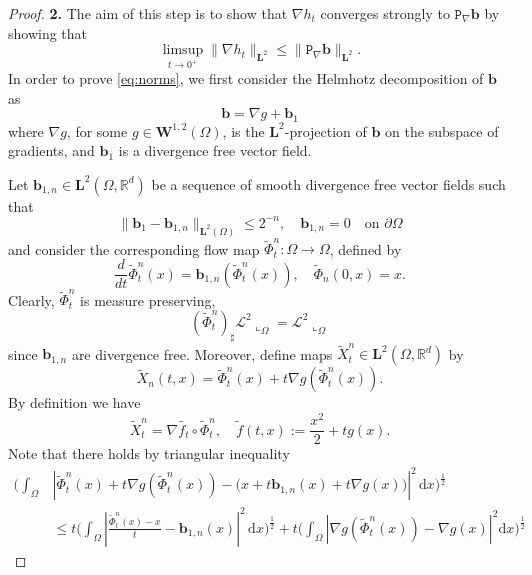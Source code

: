 \documentclass[11pt, twoside, reqno]{amsart}
\theoremstyle{definition} \newtheorem{definition}{Definition}[section]
\theoremstyle{definition} \newtheorem{remark}[definition]{Remark}
\theoremstyle{plain} \newtheorem{lemma}[definition]{Lemma}
\theoremstyle{plain} \newtheorem{proposition}[definition]{Proposition}
\theoremstyle{plain} \newtheorem{theorem}[definition]{Theorem}
\theoremstyle{plain} \newtheorem{corollary}[definition]{Corollary}
\theoremstyle{definition} \newtheorem{example}[definition]{Example}
\theoremstyle{plain} \newtheorem{claim}[clai]{Claim}
\theoremstyle{definition} \newtheorem{assumption}[definition]{Assumption}
\newcommand{\1}{\mathbbm 1}
\renewcommand{\b}{\mathbf b}
\numberwithin{equation}{section} %
\theoremstyle{plain} \newtheorem*{theorem*}{Theorem}
\theoremstyle{plain} \newtheorem{mthm}[maintheorem]{Main Theorem}
\theoremstyle{plain} \newtheorem*{mthm*}{Main Theorem}
\theoremstyle{plain} \newtheorem*{conjecture*}{Conjecture}
\theoremstyle{plain} \newtheorem{conjecture}[definition]{Conjecture}
\theoremstyle{plain} \newtheorem*{problem*}{Problem}
\begin{document}
\begin{proof}
\vspace{0.5cm}
\textbf{2.}
The aim of this step is to show that $\nabla h_t$ converges strongly to $\mathtt P_\nabla \b$ by showing that 
\begin{equation}\label{eq:norms}
    \limsup_{t \to 0^+} \|\nabla h_t\|_{\mathbf L^2} \leq \|\mathtt P_\nabla \b\|_{\mathbf L^2}.
\end{equation}
In order to prove \eqref{eq:norms}, we first consider the Helmhotz decomposition of $\b$ as
\begin{equation*}
\b = \nabla g + \b_1
\end{equation*}
where $\nabla g$, for some $g \in \mathbf W^{1,2}(\Omega)$, is the $\mathbf L^2$-projection of $\b$ on the subspace of gradients, and $\b_1$ is a divergence free vector field. 

Let $\b_{1,n} \in \mathbf L^2(\Omega, \mathbb R^d)$ be a sequence of smooth divergence free vector fields such that
\begin{equation}\label{eq:bnest}
\|\b_1 - \b_{1,n}\|_{\mathbf L^2(\Omega)} \leq 2^{-n}, \quad \b_{1,n} = 0 \quad \text{on $\partial \Omega$}
\end{equation}
and consider the corresponding flow map $\tilde \Phi^n_t: \Omega \to \Omega$, defined by
\begin{equation*}
\frac{d}{dt} \tilde \Phi^n_t(x) = \b_{1,n}(\tilde \Phi^n_t(x)), \quad \tilde \Phi_n(0,x) = x.
\end{equation*}
Clearly, $\tilde \Phi_t^n$ is measure preserving,
$$
(\tilde \Phi_t^n)_\sharp \mathscr L^2 \llcorner_\Omega = \mathscr L^2 \llcorner_\Omega
$$
since $\b_{1,n}$ are divergence free. Moreover, define  maps $\tilde X^n_t \in \mathbf L^2(\Omega, \mathbb R^d)$ by
\begin{equation*}
\tilde X_n(t,x) = \tilde \Phi^n_t(x) + t \nabla g(\tilde \Phi^n_t(x)).
\end{equation*}
By definition we have
\begin{equation*}
{\tilde X^n_t} = \nabla \tilde {f_t} \circ {\tilde \Phi^n_t}, \quad \tilde f(t,x) := \frac{x^2}{2} + t g(x).
\end{equation*}
Note that there holds by triangular inequality
\begin{equation*}
    \begin{aligned}
        \Bigg( \int_\Omega & \left| {\tilde \Phi^n_t(x)} + t \nabla g({\tilde \Phi^n_t(x)}) - \Big( x + t \b_{1,n}(x) + t \nabla g(x) \Big)\right|^2  \,\mathrm{d} x \Bigg)^{\frac{1}{2}}\\
        & \leq t \Bigg( \int_\Omega \left| \frac{\tilde \Phi^n_t(x) - x}{t} - \b_{1,n}(x)\right|^2  \,\mathrm{d} x \Bigg)^{\frac{1}{2}} + t\Bigg(\int_\Omega | \nabla g({\tilde \Phi^n_t(x)}) -   \nabla g(x)|^2 \mathrm{d} x\Bigg)^{\frac{1}{2}}

\end{aligned}
\end{equation*}
\end{proof}
\end{document}
